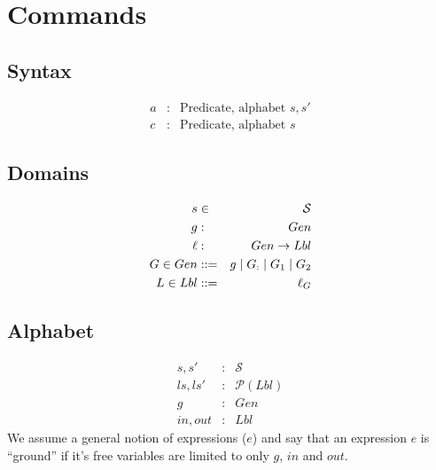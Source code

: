\section{Commands}\label{sec:commands}



\subsection{Syntax}

\begin{eqnarray*}
   a &:& \mbox{Predicate, alphabet }s,s'
\\ c &:& \mbox{Predicate, alphabet }s
\end{eqnarray*}


\subsection{Domains}
\begin{eqnarray*}
   s &\in& \mathcal S
\\ g &:& Gen
\\ \ell &:& Gen \rightarrow Lbl
\\ G \in Gen &::=&  g \mid G_{:} \mid G_1 \mid G_2
\\ L \in Lbl &::=& \ell_G
\end{eqnarray*}

\subsection{Alphabet}

\begin{eqnarray*}
   s, s' &:& \mathcal S
\\ ls, ls' &:& \mathcal P (Lbl)
\\ g &:& Gen
\\ in, out &:& Lbl
\end{eqnarray*}
We assume a general notion of expressions ($e$)
and say that an expression $e$ is ``ground''
if it's free variables are limited to only $g$, $in$ and $out$.



